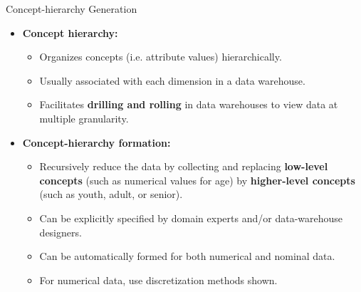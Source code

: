 \begin{frame}{Concept-hierarchy Generation}
	\begin{itemize}
		\item \textbf{Concept hierarchy:}
		      \begin{itemize}
			      \item Organizes concepts (i.e. attribute values) hierarchically.
			      \item Usually associated with each dimension in a data warehouse.
			      \item Facilitates \textbf{drilling and rolling} in data warehouses
			            to view data at multiple granularity.
		      \end{itemize}
		\item \textbf{Concept-hierarchy formation:}
		      \begin{itemize}
			      \item Recursively reduce the data by collecting and replacing
			            \textbf{low-level concepts} (such as numerical values for age) by
			            \textbf{higher-level concepts} (such as youth, adult, or senior).
			      \item Can be explicitly specified by domain experts and/or
			            data-warehouse designers.
			      \item Can be automatically formed for both numerical and nominal
			            data.
			      \item For numerical data, use discretization methods shown.
		      \end{itemize}
	\end{itemize}
\end{frame}

